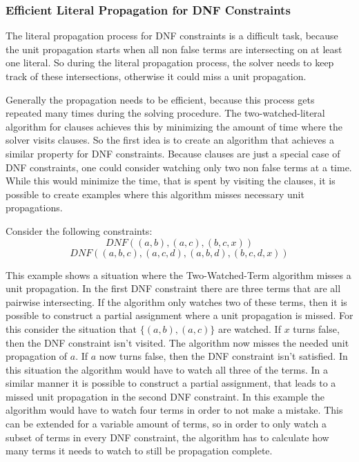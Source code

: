 \documentclass{easychair}
\begin{document}
\subsubsection{Efficient Literal Propagation for DNF Constraints}

The literal propagation process for DNF constraints is a difficult task, because the unit propagation starts when all non false terms are intersecting on at least one literal. So during the literal propagation process, the solver needs to keep track of these intersections, otherwise it could miss a unit propagation. 

Generally the propagation needs to be efficient, because this process gets repeated many times during the solving procedure. The two-watched-literal algorithm for clauses achieves this by minimizing the amount of time where the solver visits clauses. So the first idea is to create an algorithm that achieves a similar property for DNF constraints. Because clauses are just a special case of DNF constraints, one could consider watching only two non false terms at a time. While this would minimize the time, that is spent by visiting the clauses, it is possible to create examples where this algorithm misses necessary unit propagations.

Consider the following constraints:
\begin{displaymath}
DNF ((a,b),(a,c),(b,c,x))
\end{displaymath}
\begin{displaymath}
DNF ((a,b,c),(a,c,d),(a,b,d),(b,c,d,x))
\end{displaymath}

This example shows a situation where the Two-Watched-Term algorithm misses a unit propagation. In the first DNF constraint there are three terms that are all pairwise intersecting. If the algorithm only watches two of these terms, then it is possible to construct a partial assignment where a unit propagation is missed. For this consider the situation that $\{(a,b),(a,c)\}$ are watched. If $x$ turns false, then the DNF constraint isn't visited. The algorithm now misses the needed unit propagation of $a$. If $a$ now turns false, then the DNF constraint isn't satisfied. In this situation the algorithm would have to watch all three of the terms.
In a similar manner it is possible to construct a partial assignment, that leads to a missed unit propagation in the second DNF constraint. In this example the algorithm would have to watch four terms in order to not make a mistake. This can be extended for a variable amount of terms, so in order to only watch a subset of terms in every DNF constraint, the algorithm has to calculate how many terms it needs to watch to still be propagation complete. 
\end{document}
